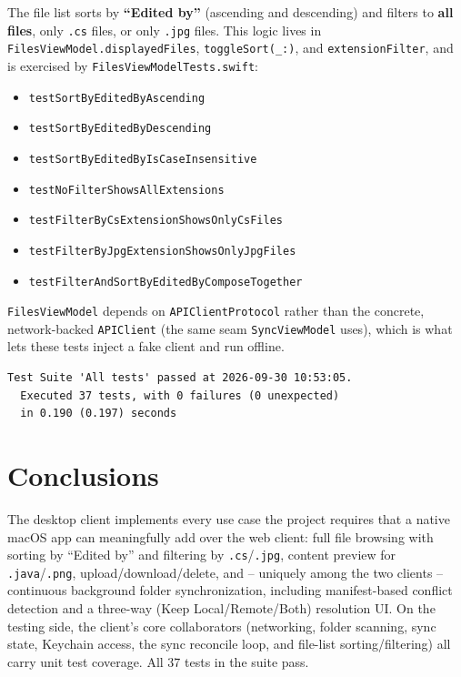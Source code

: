 \documentclass[12pt,a4paper]{article}
\begin{document}
The file list sorts by \textbf{``Edited by''} (ascending and descending) and filters to \textbf{all files}, only \texttt{.cs} files, or only \texttt{.jpg} files. This logic lives in \texttt{FilesViewModel.displayedFiles}, \texttt{toggleSort(\_:)}, and \texttt{extensionFilter}, and is exercised by \texttt{FilesViewModelTests.swift}:

\begin{itemize}[nosep]
    \item[] \texttt{testSortByEditedByAscending}
    \item[] \texttt{testSortByEditedByDescending}
    \item[] \texttt{testSortByEditedByIsCaseInsensitive}
    \item[] \texttt{testNoFilterShowsAllExtensions}
    \item[] \texttt{testFilterByCsExtensionShowsOnlyCsFiles}
    \item[] \texttt{testFilterByJpgExtensionShowsOnlyJpgFiles}
    \item[] \texttt{testFilterAndSortByEditedByComposeTogether}
\end{itemize}

\texttt{FilesViewModel} depends on \texttt{APIClientProtocol} rather than the concrete, network-backed \texttt{APIClient} (the same seam \texttt{SyncViewModel} uses), which is what lets these tests inject a fake client and run offline.

\begin{verbatim}
Test Suite 'All tests' passed at 2026-09-30 10:53:05.
  Executed 37 tests, with 0 failures (0 unexpected)
  in 0.190 (0.197) seconds
\end{verbatim}

\section{Conclusions}

The desktop client implements every use case the project requires that a native macOS app can meaningfully add over the web client: full file browsing with sorting by ``Edited by'' and filtering by \texttt{.cs}/\texttt{.jpg}, content preview for \texttt{.java}/\texttt{.png}, upload/download/delete, and -- uniquely among the two clients -- continuous background folder synchronization, including manifest-based conflict detection and a three-way (Keep Local/Remote/Both) resolution UI. On the testing side, the client's core collaborators (networking, folder scanning, sync state, Keychain access, the sync reconcile loop, and file-list sorting/filtering) all carry unit test coverage. All 37 tests in the suite pass.
\end{document}
